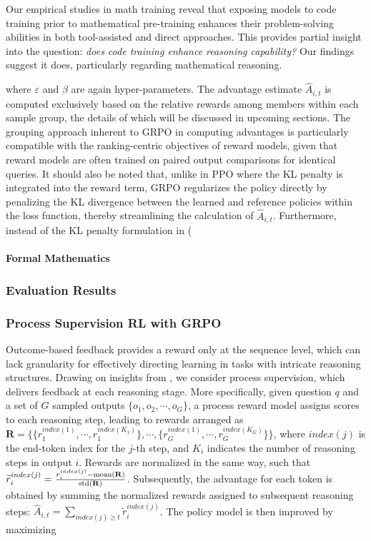     \item Our empirical studies in math training reveal that exposing models to code training prior to mathematical pre-training enhances their problem-solving abilities in both tool-assisted and direct approaches. This provides partial insight into the question: \textit{does code training enhance reasoning capability?} Our findings suggest it does, particularly regarding mathematical reasoning.

where $\varepsilon$ and $\beta$ are again hyper-parameters. The advantage estimate $\hat{A}_{i,t}$ is computed exclusively based on the relative rewards among members within each sample group, the details of which will be discussed in upcoming sections. The grouping approach inherent to GRPO in computing advantages is particularly compatible with the ranking-centric objectives of reward models, given that reward models are often trained on paired output comparisons for identical queries. It should also be noted that, unlike in PPO where the KL penalty is integrated into the reward term, GRPO regularizes the policy directly by penalizing the KL divergence between the learned and reference policies within the loss function, thereby streamlining the calculation of $\hat{A}_{i,t}$. Furthermore, instead of the KL penalty formulation in (\

\paragraph{Formal Mathematics}

\subsubsection{Evaluation Results}

\subsubsection{Process Supervision RL with GRPO} 
Outcome-based feedback provides a reward only at the sequence level, which can lack granularity for effectively directing learning in tasks with intricate reasoning structures. Drawing on insights from \cite{wang2023math}, we consider process supervision, which delivers feedback at each reasoning stage. More specifically, given question $q$ and a set of $G$ sampled outputs $\{o_1, o_2, \cdots, o_G\}$, a process reward model assigns scores to each reasoning step, leading to rewards arranged as $\mathbf{R} = \{ \{r_1^{index(1)},\cdots,r_1^{index(K_1)}\}, \cdots,  \{r_G^{index(1)},\cdots,r_G^{index(K_G)}\} \}$, where $index(j)$ is the end-token index for the $j$-th step, and $K_i$ indicates the number of reasoning steps in output $i$. Rewards are normalized in the same way, such that $\widetilde{r}_i^{index(j)} = \frac{r_i^{index(j)} - {\rm mean(\mathbf{R})}}{{\rm std(\mathbf{R})}}$.
Subsequently, the advantage for each token is obtained by summing the normalized rewards assigned to subsequent reasoning steps: $\hat{A}_{i, t} = \sum_{index(j) \ge t} \widetilde{r}_i^{index(j)}$.
The policy model is then improved by maximizing

